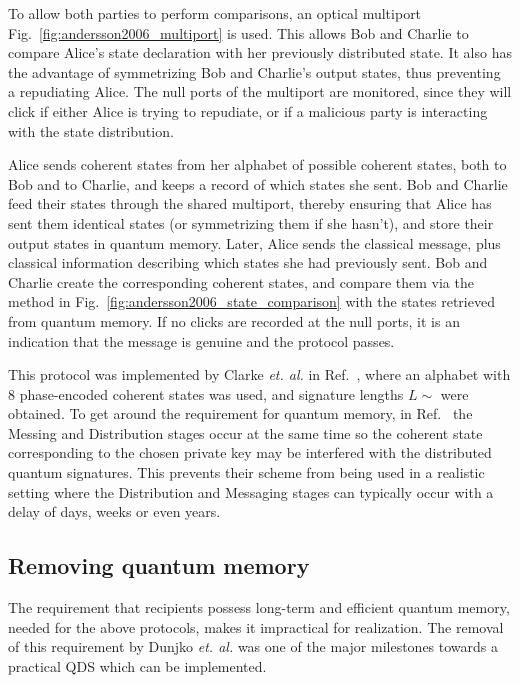 To allow both parties to perform comparisons, an optical multiport Fig.~\ref{fig:andersson2006_multiport} is used. This allows Bob and Charlie to compare Alice's state declaration with her previously distributed state. It also has the advantage of symmetrizing Bob and Charlie's output states, thus preventing a repudiating Alice. The null ports of the multiport are monitored, since they will click if either Alice is trying to repudiate, or if a malicious party is interacting with the state distribution.

Alice sends coherent states from her alphabet of possible coherent states, both to Bob and to Charlie, and keeps a record of which states she sent. Bob and Charlie feed their states through the shared multiport, thereby ensuring that Alice has sent them identical states (or symmetrizing them if she hasn't), and store their output states in quantum memory. Later, Alice sends the classical message, plus classical information describing which states she had previously sent. Bob and Charlie create the corresponding coherent states, and compare them via the method in Fig.~\ref{fig:andersson2006_state_comparison} with the states retrieved from quantum memory. If no clicks are recorded at the null ports, it is an indication that the message is genuine and the protocol passes.

This protocol was implemented by Clarke \emph{et. al.} in Ref.~\cite{Clarke2012}, where an alphabet with $8$ phase-encoded coherent states was used, and signature lengths $L \sim $ were obtained.  To get around the requirement for quantum memory, in Ref.~\cite{Clarke2012} the Messing and Distribution stages occur at the same time so the coherent state corresponding to the chosen private key may be interfered with the distributed quantum signatures. This prevents their scheme from being used in a realistic setting where the Distribution and Messaging stages can typically occur with a delay of days, weeks or even years.




\subsection*{Removing quantum memory}
The requirement that recipients possess long-term and efficient quantum memory, needed for the above protocols, makes it impractical for realization. The removal of this requirement by Dunjko \emph{et. al.} \cite{Dunjko2014} was one of the major milestones towards a practical QDS which can be implemented. 

